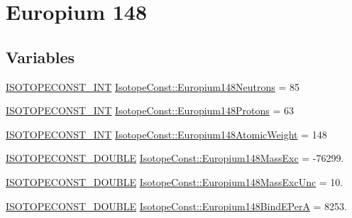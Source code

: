 \hypertarget{group___isotope_const-_europium-_eu148}{}\section{Europium 148}
\label{group___isotope_const-_europium-_eu148}
\subsection*{Variables}
\begin{DoxyCompactItemize}
\item 
\mbox{\hyperlink{group___isotope_const-_macros_ga5f18360b3e99483a35c32d789e62621c}{I\+S\+O\+T\+O\+P\+E\+C\+O\+N\+S\+T\+\_\+\+I\+NT}} \mbox{\hyperlink{group___isotope_const-_europium-_eu148_ga528bbb1d23931d1df209f76fd6e00657}{Isotope\+Const\+::\+Europium148\+Neutrons}} = 85
\item 
\mbox{\hyperlink{group___isotope_const-_macros_ga5f18360b3e99483a35c32d789e62621c}{I\+S\+O\+T\+O\+P\+E\+C\+O\+N\+S\+T\+\_\+\+I\+NT}} \mbox{\hyperlink{group___isotope_const-_europium-_eu148_ga1d0562ebbe910d1370789ad8bf815bca}{Isotope\+Const\+::\+Europium148\+Protons}} = 63
\item 
\mbox{\hyperlink{group___isotope_const-_macros_ga5f18360b3e99483a35c32d789e62621c}{I\+S\+O\+T\+O\+P\+E\+C\+O\+N\+S\+T\+\_\+\+I\+NT}} \mbox{\hyperlink{group___isotope_const-_europium-_eu148_gafc4b1e58331433f44269e6c90a99a499}{Isotope\+Const\+::\+Europium148\+Atomic\+Weight}} = 148
\item 
\mbox{\hyperlink{group___isotope_const-_macros_ga8f45a7272ce02c0b4c65c44636ed719a}{I\+S\+O\+T\+O\+P\+E\+C\+O\+N\+S\+T\+\_\+\+D\+O\+U\+B\+LE}} \mbox{\hyperlink{group___isotope_const-_europium-_eu148_ga75bb005f0c1c98d8527f68ba9ac2856a}{Isotope\+Const\+::\+Europium148\+Mass\+Exc}} = -\/76299.
\item 
\mbox{\hyperlink{group___isotope_const-_macros_ga8f45a7272ce02c0b4c65c44636ed719a}{I\+S\+O\+T\+O\+P\+E\+C\+O\+N\+S\+T\+\_\+\+D\+O\+U\+B\+LE}} \mbox{\hyperlink{group___isotope_const-_europium-_eu148_ga082070a74e2ccae77f1c7423f8813651}{Isotope\+Const\+::\+Europium148\+Mass\+Exc\+Unc}} = 10.
\item 
\mbox{\hyperlink{group___isotope_const-_macros_ga8f45a7272ce02c0b4c65c44636ed719a}{I\+S\+O\+T\+O\+P\+E\+C\+O\+N\+S\+T\+\_\+\+D\+O\+U\+B\+LE}} \mbox{\hyperlink{group___isotope_const-_europium-_eu148_ga7421090692ec7269be16b6e7ac0f1bd7}{Isotope\+Const\+::\+Europium148\+Bind\+E\+PerA}} = 8253.
\item 

\end{DoxyCompactItemize}
